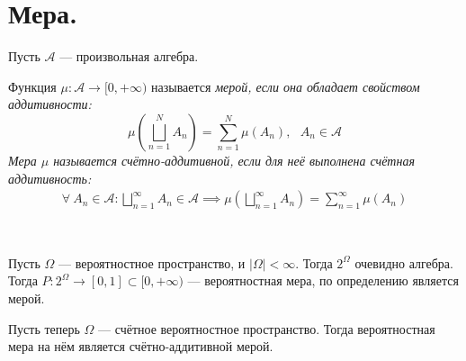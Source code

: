 \section{Мера.}
Пусть $\mathcal{A}$ --- произвольная алгебра.
\begin{definition}
    Функция $\mu \colon \mathcal{A} \to [0, +\infty)$ называется \it{мерой}, если она обладает
    свойством аддитивности:
    \[
        \mu\left( \bigsqcup_{n = 1}^N A_n \right) = \sum\limits_{n = 1}^N \mu(A_n), \:\:\: A_n \in \mathcal{A}
    \]
    Мера $\mu$ называется \it{счётно-аддитивной}, если для неё выполнена \it{счётная аддитивность}:
    \begin{align*}
        \forall \: A_n \in \mathcal{A} \colon \bigsqcup_{n = 1}^{\infty} A_n \in \mathcal{A}
        \implies
        \mu\left( \bigsqcup_{n = 1}^{\infty} A_n \right) = \sum\limits_{n = 1}^{\infty} \mu(A_n)
    \end{align*}
\end{definition}
\begin{example}{\ }

    Пусть $\Omega$ --- вероятностное пространство, и $|\Omega| < \infty$. Тогда $2^{\Omega}$ очевидно
    алгебра. Тогда $P \colon 2^{\Omega} \to [0, 1] \subset [0, +\infty)$ --- вероятностная мера, по
    определению является мерой.

    Пусть теперь $\Omega$ --- счётное вероятностное пространство. Тогда вероятностная мера на нём является
    счётно-аддитивной мерой.
\end{example}
\begin{comment}
    \hyperref[length example]{В пункте 2.2 мы привели пример алгебры} $\mathcal{A}$ конечных объединений
    попарно непересекающихся промежутков на отрезке $[0, 1]$. На этом отрезке есть мера $\lambda$,
    которую мы привыкли понимать как ''длина промежутков``. Нам хочется знать, а можно ли такую удобную
    функцию продолжить с такой области определения на нечто большее. Например на алгебру, порождаемую
    этой. Нетрудно видеть, что $\sigma(\mathcal{A}) = \mathcal{B}[0, 1]$. Таким образом если продолжим
    $\lambda$ на Борелевскую алгебру, мы сможем находить длину (далее будем всё же использовать термин
    ''мера``) практически произвольного подмножества в $[0, 1]$, а значит, на самом деле, в любом отрезке.
\end{comment}
